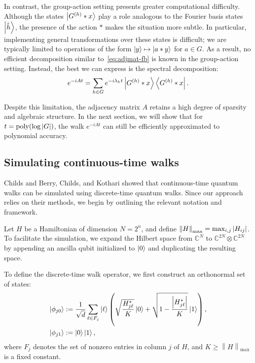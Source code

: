 \documentclass[12pt]{report}
\newcommand{\opnorm}[1]{\left\lVert #1 \right\rVert}
\begin{document}
In contrast, the group-action setting presents greater computational difficulty. Although the states \( \ket{G^{(h)} * x} \) play a role analogous to the Fourier basis states \( \ket{\hat{h}} \), the presence of the action \( * \) makes the situation more subtle. In particular, implementing general transformations over these states is difficult; we are typically limited to operations of the form \( \ket{y} \mapsto \ket{a * y} \) for \( a \in G \). As a result, no efficient decomposition similar to~\eqref{eq:adjmat-fb} is known in the group-action setting. Instead, the best we can express is the spectral decomposition:
\[
e^{-iAt} = \sum_{h \in G} e^{-i\lambda_h t} \ket{G^{(h)} * x} \bra{G^{(h)} * x}.
\]

Despite this limitation, the adjacency matrix \( A \) retains a high degree of sparsity and algebraic structure. In the next section, we will show that for \( t = \operatorname{poly}(\log \abs{G}) \), the walk \( e^{-iAt} \) can still be efficiently approximated to polynomial accuracy.



\subsection{Simulating continuous-time walks}
Childs and Berry, Childs, and Kothari showed that continuous-time quantum walks can be simulated using discrete-time quantum walks. Since our approach relies on their methods, we begin by outlining the relevant notation and framework.

Let \( H \) be a Hamiltonian of dimension \( N = 2^n \), and define \( \opnorm{H}_{\mathrm{max}} = \max_{i, j} \abs{H_{ij}} \). To facilitate the simulation, we expand the Hilbert space from \( \mathbb{C}^N \) to \( \mathbb{C}^{2N} \otimes \mathbb{C}^{2N} \) by appending an ancilla qubit initialized to \( \ket{0} \) and duplicating the resulting space.

To define the discrete-time walk operator, we first construct an orthonormal set of states:
\begin{align}
    \ket{\phi_{j0}} & := \frac{1}{\sqrt{d}} \sum_{\ell \in F_j} \ket{\ell} \left( \sqrt{\frac{H_{j\ell}^*}{K}} \ket{0} + \sqrt{1 - \frac{\abs{H_{j\ell}^*}}{K}} \ket{1} \right), \label{eq:walk-sim} \\
    \ket{\phi_{j1}} & := \ket{0} \ket{1}, \nonumber
\end{align}
where \( F_j \) denotes the set of nonzero entries in column \( j \) of \( H \), and \( K \ge \opnorm{H}_{\mathrm{max}} \) is a fixed constant.
\end{document}
